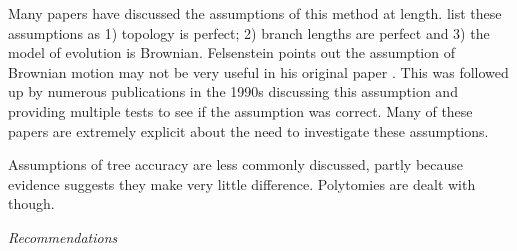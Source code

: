 \documentclass[a4paper,12pt]{article}
\renewcommand{\subsection}[1]{
  \bigskip
  \begin{center}
  \begin{large}
  \normalfont\itshape #1
  \end{large}
  \end{center}
}
\begin{document}
Many papers have discussed the assumptions of this method at length.\citealp{diaz1996testing} list these assumptions as 1) topology is perfect; 2) branch lengths are perfect and 3) the model of evolution is Brownian. Felsenstein points out the assumption of Brownian motion may not be very useful in his original paper \citet[p.13]{felsenstein1985phylogenies}. This was followed up by numerous publications in the 1990s discussing this assumption and providing multiple tests to see if the assumption was correct. Many of these papers are extremely explicit about the need to investigate these assumptions. 

Assumptions of tree accuracy are less commonly discussed, partly because evidence suggests they make very little difference. Polytomies are dealt with though.


\subsection{Recommendations}







\end{document}
